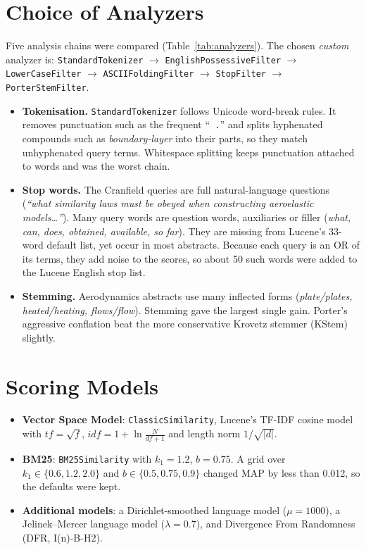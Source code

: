 \documentclass[10pt,a4paper]{article}
\newcommand{\code}[1]{\texttt{\small #1}}
\begin{document}
\section{Choice of Analyzers}

Five analysis chains were compared (Table~\ref{tab:analyzers}). The chosen \emph{custom}
analyzer is:
\code{StandardTokenizer} $\rightarrow$ \code{EnglishPossessiveFilter} $\rightarrow$
\code{LowerCaseFilter} $\rightarrow$ \code{ASCIIFoldingFilter} $\rightarrow$
\code{StopFilter} $\rightarrow$ \code{PorterStemFilter}.

\begin{itemize}
  \item \textbf{Tokenisation.} \code{StandardTokenizer} follows Unicode word-break rules. It
  removes punctuation such as the frequent ``\code{ .}'' and splits hyphenated compounds such
  as \emph{boundary-layer} into their parts, so they match unhyphenated query terms.
  Whitespace splitting keeps punctuation attached to words and was the worst chain.
  \item \textbf{Stop words.} The Cranfield queries are full natural-language questions
  (\emph{``what similarity laws must be obeyed when constructing aeroelastic models\dots''}).
  Many query words are question words, auxiliaries or filler (\emph{what, can, does, obtained,
  available, so far}). They are missing from Lucene's 33-word default list, yet occur in most
  abstracts. Because each query is an OR of its terms, they add noise to the scores, so about
  50 such words were added to the Lucene English stop list.
  \item \textbf{Stemming.} Aerodynamics abstracts use many inflected forms
  (\emph{plate/plates, heated/heating, flows/flow}). Stemming gave the largest single gain.
  Porter's aggressive conflation beat the more conservative Krovetz stemmer (KStem) slightly.
\end{itemize}

\section{Scoring Models}

\begin{itemize}
  \item \textbf{Vector Space Model}: \code{ClassicSimilarity}, Lucene's TF-IDF cosine model
  with $tf=\sqrt{f}$, $idf = 1+\ln\frac{N}{df+1}$ and length norm $1/\sqrt{|d|}$.
  \item \textbf{BM25}: \code{BM25Similarity} with $k_1=1.2$, $b=0.75$. A grid over
  $k_1\in\{0.6,1.2,2.0\}$ and $b\in\{0.5,0.75,0.9\}$ changed MAP by less than 0.012, so the
  defaults were kept.
  \item \textbf{Additional models}: a Dirichlet-smoothed language model ($\mu=1000$), a
  Jelinek--Mercer language model ($\lambda=0.7$), and Divergence From Randomness (DFR,
  I(n)-B-H2).
\end{itemize}
\end{document}

